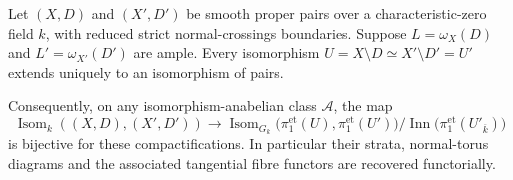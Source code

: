 \begin{theorem}\label{A6-canonical-compactification}
Let $(X,D)$ and $(X',D')$ be smooth proper pairs over a characteristic-zero field $k$, with reduced strict normal-crossings boundaries. Suppose
$L=\omega_X(D)$ and $L'=\omega_{X'}(D')$ are ample. Every isomorphism
$U=X\setminus D\simeq X'\setminus D'=U'$ extends uniquely to an isomorphism of pairs.

Consequently, on any isomorphism-anabelian class $\mathcal A$, the map
\[
 \operatorname{Isom}_k((X,D),(X',D'))
 \longrightarrow
 \operatorname{Isom}_{G_k}
       \bigl(\pi_1^{\mathrm{et}}(U),\pi_1^{\mathrm{et}}(U')\bigr)
       /\operatorname{Inn}\bigl(\pi_1^{\mathrm{et}}(U'_{\overline{k}})\bigr)
\]
is bijective for these compactifications. In particular their strata, normal-torus diagrams and the associated tangential fibre functors are recovered functorially.
\end{theorem}
